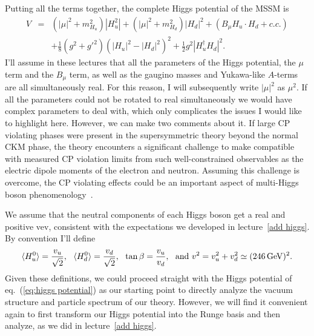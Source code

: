 \documentclass[12pt]{article}
\def\beq{\begin{eqnarray}}
\def\eeq{\end{eqnarray}}
\def\gev{\, {\rm GeV}}
\def\eq#1{eq.~(\ref{#1})}
\begin{document}
Putting all the terms together, the complete Higgs potential of the MSSM is
\beq
V&=&(|\mu|^2+m^2_{H_u})|H_u^2|+(|\mu|^2+m^2_{H_d})|H_d|^2 +(B_\mu H_u\cdot H_d+c.c.) \nonumber\\
& & +\frac{1}{8}(g^2+g'^2)(|H_u|^2-|H_d|^2)^2+\frac{1}{2}g^2|H_u^\dagger H_d|^2.
\label{eq:higgs potential}
\eeq
I'll assume in these lectures that all the parameters of the Higgs potential, the $\mu$ term and the $B_\mu$ term, as well as the gaugino masses and Yukawa-like $A$-terms are all simultaneously real. For this reason, I will subsequently write $|\mu|^2$ as $\mu^2$.  If all the parameters could not be rotated to real simultaneously  we would have complex parameters to deal with, which only complicates the issues I would like to highlight here. However, we can make two comments about it. If large CP violating phases were present in the supersymmetric theory beyond the normal CKM phase, the theory encounters a significant challenge to make compatible with measured CP violation limits from such well-constrained observables as the electric dipole moments of the electron and neutron.   Assuming this challenge is overcome, the CP violating effects could be an important aspect of multi-Higgs boson phenomenology~\cite{Pilaftsis:1999qt,Carena:2002bb}.

We assume that the neutral components of each Higgs boson get a real and positive vev, consistent with the expectations we developed in lecture~\ref{add higgs}.  By convention I'll define
\beq
\langle H_u^0\rangle=\frac{v_u}{\sqrt{2}},~~
\langle H_d^0\rangle=\frac{v_d}{\sqrt{2}},~~
\tan\beta=\frac{v_u}{v_d},~~
{\rm and}~v^2=v_u^2+v_d^2\simeq (246\gev)^2.
\eeq
Given these definitions, we could proceed straight  with the Higgs potential of \eq{eq:higgs potential} as our starting point to directly analyze the vacuum structure and particle spectrum of our theory.  However, we will find it convenient again to first transform our Higgs potential into the Runge basis and then analyze, as we did in lecture~\ref{add higgs}.
\end{document}
